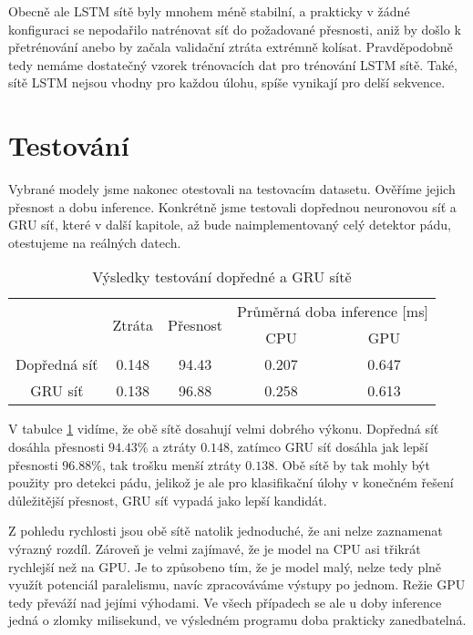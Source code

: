 Obecně ale LSTM sítě byly mnohem méně stabilní, a prakticky v žádné konfiguraci
se nepodařilo natrénovat síť do požadované přesnosti, aniž by došlo k
přetrénování anebo by začala validační ztráta extrémně kolísat. Pravděpodobně
tedy nemáme dostatečný vzorek trénovacích dat pro trénování LSTM sítě. Také,
sítě LSTM nejsou vhodny pro každou úlohu, spíše vynikají pro delší sekvence.

\section{Testování}
\label{sec:testing}

Vybrané modely jsme nakonec otestovali na testovacím datasetu. Ověříme jejich
přesnost a dobu inference. Konkrétně jsme testovali dopřednou neuronovou síť a
GRU síť, které v další kapitole, až bude naimplementovaný celý detektor pádu,
otestujeme na reálných datech.

\begin{table}[htbp]
    \centering
    \caption{Výsledky testování dopředné a GRU sítě}
    \label{tab:testing}
    \begin{tabular}{|c|c|c|cc|}
        \hline
        \multirow{2}{*}{} & \multirow{2}{*}{Ztráta} & \multirow{2}{*}{Přesnost} & \multicolumn{2}{c|}{Průměrná doba inference [ms]}         \\ \cline{4-5}
                          &                         &                           & \multicolumn{1}{c|}{  CPU  }                      & GPU   \\ \hline
        Dopředná síť      & 0.148                   & 94.43                     & \multicolumn{1}{c|}{0.207}                        & 0.647 \\ \hline
        GRU síť           & 0.138                   & 96.88                     & \multicolumn{1}{c|}{0.258}                        & 0.613 \\ \hline
    \end{tabular}
\end{table}

V tabulce \ref{tab:testing} vidíme, že obě sítě dosahují velmi dobrého výkonu.
Dopředná síť dosáhla přesnosti $94.43\%$ a ztráty $0.148$, zatímco GRU síť
dosáhla jak lepší přesnosti $96.88\%$, tak trošku menší ztráty $0.138$. Obě
sítě by tak mohly být použity pro detekci pádu, jelikož je ale pro klasifikační
úlohy v konečném řešení důležitější přesnost, GRU síť vypadá jako lepší
kandidát.

Z pohledu rychlosti jsou obě sítě natolik jednoduché, že ani nelze zaznamenat
výrazný rozdíl. Zároveň je velmi zajímavé, že je model na CPU asi třikrát
rychlejší než na GPU. Je to způsobeno tím, že je model malý, nelze tedy plně
využít potenciál paralelismu, navíc zpracováváme výstupy po jednom. Režie GPU
tedy převáží nad jejími výhodami. Ve všech případech se ale u doby inference
jedná o zlomky milisekund, ve výsledném programu doba prakticky zanedbatelná.

